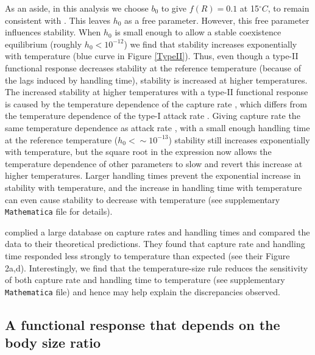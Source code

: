 \documentclass[11pt]{article}
\begin{document}
As an aside, in this analysis we choose $b_0$ to give $f(R) = 0.1$ at 15$^\circ C$, to remain consistent with \cite{Gilbert2014}.
This leaves $h_0$ as a free parameter. 
However, this free parameter influences stability.
When $h_0$ is small enough to allow a stable coexistence equilibrium (roughly $h_0 <10^{-12}$) we find that stability increases exponentially with temperature (blue curve in Figure \ref{TypeII}).
Thus, even though a type-II functional response decreases stability at the reference temperature (because of the lags induced by handling time), stability is increased at higher temperatures. 
The increased stability at higher temperatures with a type-II functional response is caused by the temperature dependence of the capture rate \citep{Rall2012}, which differs from the temperature dependence of the type-I attack rate \citep{Gilbert2014}.
Giving capture rate the same temperature dependence as attack rate \citep{Gilbert2014}, with a small enough handling time at the reference temperature ($h_0 <\sim10^{-13}$) stability still increases exponentially with temperature, but the square root in the expression now allows the temperature dependence of other parameters to slow and revert this increase at higher temperatures.
Larger handling times prevent the exponential increase in stability with temperature, and the increase in handling time with temperature can even cause stability to decrease with temperature (see supplementary \texttt{Mathematica} file for details). 

\cite{Rall2012} complied a large database on capture rates and handling times and compared the data to their theoretical predictions.
They found that capture rate and handling time responded less strongly to temperature than expected (see their Figure 2a,d).
Interestingly, we find that the temperature-size rule reduces the sensitivity of both capture rate and handling time to temperature (see supplementary \texttt{Mathematica} file) and hence may help explain the discrepancies observed. 

\subsection*{A functional response that depends on the body size ratio}
\end{document}
